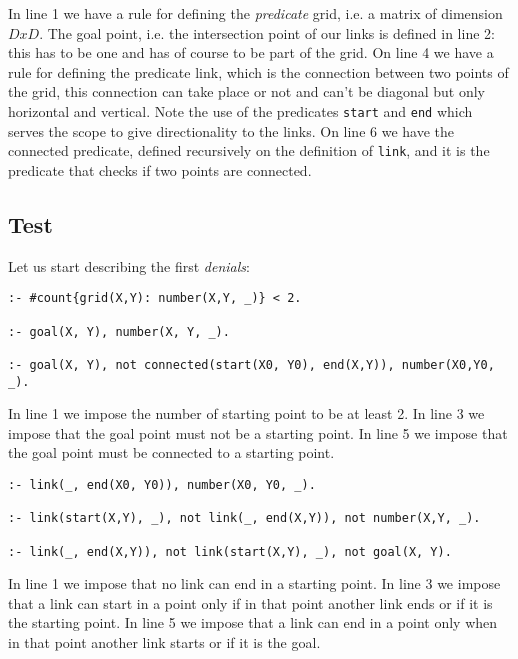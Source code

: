 In line 1 we have a rule for defining the \emph{predicate} grid, i.e. a matrix of dimension $DxD$. The goal point, i.e. the intersection point of our links is defined in line 2: this has to be one and has of course to be part of the grid.
On line 4 we have a rule for defining the predicate link, which is the connection between two points of the grid, this connection can take place or not and can't be diagonal but only horizontal and vertical. Note the use of the predicates \texttt{start} and \texttt{end} which serves the scope to give directionality to the links.
On line 6 we have the connected predicate, defined recursively on the definition of \texttt{link}, and it is the predicate that checks if two points are connected.
\subsection{Test}
Let us start describing the first \emph{denials}:

\begin{verbatim}
:- #count{grid(X,Y): number(X,Y, _)} < 2. 

:- goal(X, Y), number(X, Y, _). 

:- goal(X, Y), not connected(start(X0, Y0), end(X,Y)), number(X0,Y0, _). 
\end{verbatim}

In line 1 we impose the number of starting point to be at least 2. In line 3 we impose that the goal point must not be a starting point.
In line 5 we impose that the goal point must be connected to a starting point.


\begin{verbatim}
:- link(_, end(X0, Y0)), number(X0, Y0, _).

:- link(start(X,Y), _), not link(_, end(X,Y)), not number(X,Y, _).

:- link(_, end(X,Y)), not link(start(X,Y), _), not goal(X, Y). 
\end{verbatim}
In line 1 we impose that no link can end in a starting point. In line 3 we impose that a link can start in a point only if in that point another link ends or if it is the starting point. In line 5 we impose that a link can end in a point only when in that point another link starts or if it is the goal.


